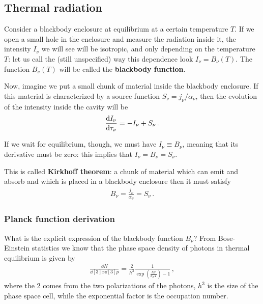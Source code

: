 \documentclass[main.tex]{subfiles}
\begin{document}
\subsection{Thermal radiation}


Consider a blackbody enclosure at equilibrium at a certain temperature \(T\). If we open a small hole in the enclosure and measure the radiation inside it, the intensity \(I_\nu \) we will see will be isotropic, and only depending on the temperature \(T\): let us call the (still unspecified) way this dependence look \(I_\nu = B_\nu (T)\). The function \(B_\nu (T)\) will be called the \textbf{blackbody function}. 

Now, imagine we put a small chunk of material inside the blackbody enclosure. If this material is characterized by a source function \(S_\nu = j_\nu / \alpha_{\nu }\), then the evolution of the intensity inside the cavity will be 
%
\begin{align}
\dv{I_\nu }{\tau_{\nu }} = - I_\nu + S_\nu 
\,.
\end{align}

If we wait for equilibrium, though, we must have \(I_\nu \equiv B_\nu \), meaning that its derivative must be zero: this implies that \(I_\nu = B_\nu = S_\nu \). 

This is called \textbf{Kirkhoff theorem}: a chunk of material which can emit and absorb and which is placed in a blackbody enclosure then it must satisfy 
%
\begin{align}
B_\nu = \frac{j_\nu}{\alpha_{\nu }} = S_\nu 
\,.
\end{align}

\subsubsection{Planck function derivation}

What is the explicit expression of the blackbody function \(B_\nu \)? 
From Bose-Einstein statistics we know that the phase space density of photons in thermal equilibrium is given by 
%
\begin{align}
\frac{ \dd{N}}{ \dd[3]{x} \dd[3]{p}} = \frac{2}{h^3} \frac{1}{\exp( \frac{h \nu }{k_B T}) - 1}
\,,
\end{align}
%
where the 2 comes from the two polarizations of the photons, \(h^3\) is the size of the phase space cell, while the exponential factor is the occupation number. 
\end{document}
